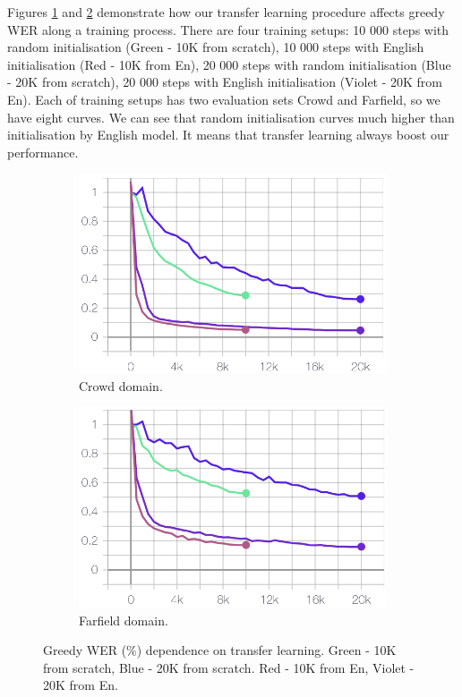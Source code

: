 \documentclass[a4paper]{article}
\begin{document}
Figures \ref{fig:crowd_domain} and \ref{fig:portal_domain} demonstrate how our transfer learning procedure affects greedy WER along a training process. There are four training setups: 10 000 steps with random initialisation (Green - 10K from scratch), 10 000 steps with English initialisation (Red - 10K from En), 20 000 steps with random initialisation (Blue - 20K from scratch), 20 000 steps with English initialisation (Violet - 20K from En). Each of training setups has two evaluation sets Crowd and Farfield, so we have eight curves. We can see that random initialisation curves much higher than initialisation by English model. It means that transfer learning always boost our performance.

\begin{figure}[ht]
\begin{subfigure}{.99\linewidth}
  \centering
  \includegraphics[width=1.\linewidth]{LaTeX/img/crowd10k20k.png}  
  \caption{Crowd domain.}
  \label{fig:crowd_domain}
\end{subfigure}
\begin{subfigure}{.99\linewidth}
  \centering
  \includegraphics[width=1.\linewidth]{LaTeX/img/portal10k20k.png}  
  \caption{Farfield domain.}
  \label{fig:portal_domain}
\end{subfigure}
\caption{Greedy WER (\%) dependence on transfer learning. Green - 10K from scratch, Blue - 20K from scratch. Red - 10K from En, Violet - 20K from En.}
\label{fig:portal_crowd_domain}
\end{figure}
\end{document}
